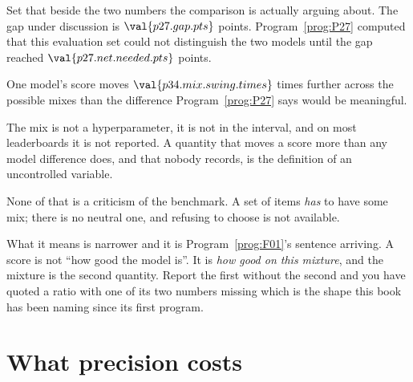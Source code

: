 \begin{fr}

Set that beside the two numbers the comparison is actually arguing about.
The gap under discussion is $\val{p27.gap.pts}$ points.
Program~\ref{prog:P27} computed that this evaluation set could not
distinguish the two models until the gap reached
$\val{p27.net.needed.pts}$ points.

\begin{trapbox}
One model's score moves $\val{p34.mix.swing.times}$ times further across the
possible mixes than the difference Program~\ref{prog:P27} says would be
meaningful.

The mix is not a hyperparameter, it is not in the interval, and on most
leaderboards it is not reported. A quantity that moves a score more than any
model difference does, and that nobody records, is the definition of an
uncontrolled variable.
\end{trapbox}
\end{fr}

\begin{fr}
None of that is a criticism of the benchmark. A set of items \emph{has} to
have some mix; there is no neutral one, and refusing to choose is not
available.

What it means is narrower and it is Program~\ref{prog:F01}'s sentence
arriving. A score is not \enquote{how good the model is}. It is \emph{how
good on this mixture}, and the mixture is the second quantity. Report the
first without the second and you have quoted a ratio with one of its two
numbers missing \dash{} which is the shape this book has been naming since
its first program.

\end{fr}

\section{What precision costs}
\label{sec:P34-interval}

